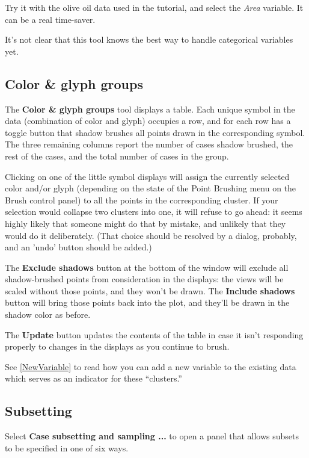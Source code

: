 \documentclass[11pt]{article}
\begin{document}
Try it with the olive oil data used in the tutorial, and select the {\it
Area} variable.  It can be a real time-saver.

It's not clear that this tool knows the best way to handle categorical
variables yet.

\subsection{Color \& glyph groups}
\label{slbl:ColorAndGlyphGroups}

The {\bf Color \& glyph groups} tool displays a table.  Each unique
symbol in the data (combination of color and glyph) occupies a row,
and for each row has a toggle button that shadow brushes all points
drawn in the corresponding symbol.  The three remaining columns
report the number of cases shadow brushed, the rest of the cases, and
the total number of cases in the group.

Clicking on one of the little symbol displays will assign the
currently selected color and/or glyph (depending on the state of the
Point Brushing menu on the Brush control panel) to all the points in
the corresponding cluster.  If your selection would collapse two
clusters into one, it will refuse to go ahead:  it seems highly
likely that someone might do that by mistake, and unlikely that they
would do it deliberately.  (That choice should be resolved by a
dialog, probably, and an 'undo' button should be added.)

The {\bf Exclude shadows} button at the bottom of the window will
exclude all shadow-brushed points from consideration in the
displays:  the views will be scaled without those points, and they
won't be drawn.  The {\bf Include shadows} button will bring those
points back into the plot, and they'll be drawn in the shadow color
as before.

The {\bf Update} button updates the contents of the table in case it
isn't responding properly to changes in the displays as you continue
to brush.


See \ref{NewVariable} to read how you can add a new variable to the
existing data which serves as an indicator for these ``clusters.''

\subsection{Subsetting}

Select {\bf Case subsetting and sampling ...} to open a panel
that allows subsets to be specified in one of six ways.
\end{document}
